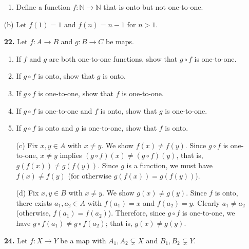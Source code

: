\documentclass[12pt,reqno]{amsart}
\renewcommand{\subset}{\ensuremath{\subsetneq}}
\begin{document}
\begin{enumerate}[{\bf 1.}]
\begin{enumerate}
\item
Define a function $f: {\mathbb N} \rightarrow {\mathbb N}$ that is onto but not one-to-one. 
 
\end{enumerate}
\bigskip
{}
(b) Let $f(1) = 1$ and $f(n) = n-1$ for $n>1$.

\bigskip
 
\item[{\bf 22.}]
Let $f : A \rightarrow B$ and $g : B \rightarrow C$ be maps.
\begin{enumerate}
 
\item
If $f$ and $g$ are both one-to-one functions, show that $g \circ f$
is one-to-one. 
 
\item
If $g \circ f$ is onto, show that $g$ is onto.
 
\item
If $g \circ f$ is one-to-one, show that $f$ is one-to-one.
 
\item
If $g \circ f$ is one-to-one and $f$ is onto, show that $g$ is
one-to-one.
 
\item
If $g \circ f$ is onto and $g$ is one-to-one, show that $f$ is onto.
 
\end{enumerate}
\bigskip
{}
\medskip
 
\begin{enumerate}
\item[(c)] 
Fix $x, y \in A$ with $x \neq y$.  We show $f(x) \neq f(y)$.
Since $g\circ f$ is one-to-one, $x\neq y$ implies 
$(g\circ f)(x) \neq (g\circ f)(y)$, that is, 
$g(f(x)) \neq g(f(y))$.  Since $g$ is a function, 
we must have $f(x) \neq f(y)$ (for otherwise $g(f(x)) = g(f(y))$).

\medskip

\item[(d)] 
Fix $x, y \in B$ with $x\neq y$.  We show $g(x) \neq g(y)$.
Since $f$ is onto, there exists $a_1, a_2 \in A$ with 
$f(a_1) = x$ and 
$f(a_2) = y$.  Clearly $a_1 \neq a_2$ (otherwise, $f(a_1) = f(a_2)$).
Therefore, since $g\circ f$ is one-to-one, we have
$g\circ f(a_1) \neq g\circ f(a_2)$; that is, 
$g(x) \neq g(y)$.

\end{enumerate}
\bigskip

\item[{\bf 24.}]
Let $f: X \rightarrow Y$ be a map with $A_1, A_2 \subset X$ and $B_1, B_2 \subset Y$. 
\begin{enumerate}
 

\end{enumerate}
\end{enumerate}
\end{document}

